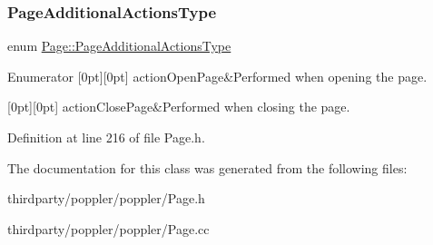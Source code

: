 \subsubsection{\texorpdfstring{Page\+Additional\+Actions\+Type}{PageAdditionalActionsType}}
{\footnotesize\ttfamily enum \hyperlink{class_page_a283db2a63b02abe61631781a057c4746}{Page\+::\+Page\+Additional\+Actions\+Type}}

\begin{DoxyEnumFields}{Enumerator}
[0pt][0pt]{}\mbox{\label{class_page_a283db2a63b02abe61631781a057c4746a5f1f2435b57253632eec56462f73e2aa}} 
action\+Open\+Page&Performed when opening the page. \\
\hline

[0pt][0pt]{}\mbox{\label{class_page_a283db2a63b02abe61631781a057c4746a49adb8e6acf66f345912cfdc78f11667}} 
action\+Close\+Page&Performed when closing the page. \\
\hline

\end{DoxyEnumFields}


Definition at line 216 of file Page.\+h.



The documentation for this class was generated from the following files\+:\begin{DoxyCompactItemize}
\item 
thirdparty/poppler/poppler/Page.\+h\item 
thirdparty/poppler/poppler/Page.\+cc\end{DoxyCompactItemize}
